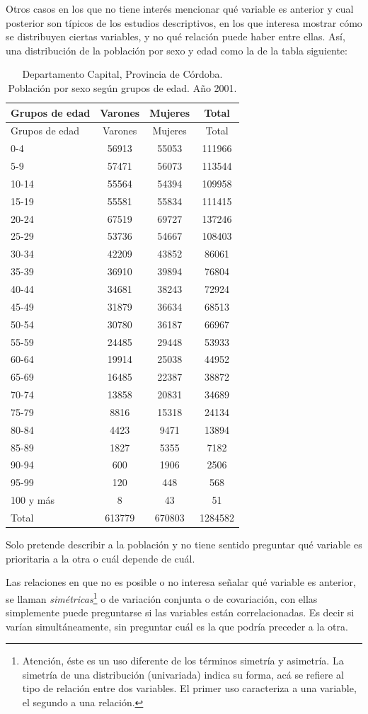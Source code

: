 \documentclass[]{book}
\let\rmarkdownfootnote\footnote%
\def\footnote{\protect\rmarkdownfootnote}
\begin{document}
Otros casos en los que no tiene interés mencionar qué variable es
anterior y cual posterior son típicos de los estudios descriptivos, en
los que interesa mostrar cómo se distribuyen ciertas variables, y no qué
relación puede haber entre ellas. Así, una distribución de la población por sexo y edad como la de la tabla siguiente:

\begin{longtable}[]{@{}lccc@{}}
\caption{\label{tab:unnamed-chunk-125}Departamento Capital, Provincia de Córdoba. Población por sexo según grupos de edad. Año 2001.}\tabularnewline
\toprule
Grupos de edad & Varones & Mujeres & Total\tabularnewline
\midrule
\endfirsthead
\toprule
Grupos de edad & Varones & Mujeres & Total\tabularnewline
\midrule
\endhead
0-4 & 56913 & 55053 & 111966\tabularnewline
5-9 & 57471 & 56073 & 113544\tabularnewline
10-14 & 55564 & 54394 & 109958\tabularnewline
15-19 & 55581 & 55834 & 111415\tabularnewline
20-24 & 67519 & 69727 & 137246\tabularnewline
25-29 & 53736 & 54667 & 108403\tabularnewline
30-34 & 42209 & 43852 & 86061\tabularnewline
35-39 & 36910 & 39894 & 76804\tabularnewline
40-44 & 34681 & 38243 & 72924\tabularnewline
45-49 & 31879 & 36634 & 68513\tabularnewline
50-54 & 30780 & 36187 & 66967\tabularnewline
55-59 & 24485 & 29448 & 53933\tabularnewline
60-64 & 19914 & 25038 & 44952\tabularnewline
65-69 & 16485 & 22387 & 38872\tabularnewline
70-74 & 13858 & 20831 & 34689\tabularnewline
75-79 & 8816 & 15318 & 24134\tabularnewline
80-84 & 4423 & 9471 & 13894\tabularnewline
85-89 & 1827 & 5355 & 7182\tabularnewline
90-94 & 600 & 1906 & 2506\tabularnewline
95-99 & 120 & 448 & 568\tabularnewline
100 y más & 8 & 43 & 51\tabularnewline
Total & 613779 & 670803 & 1284582\tabularnewline
\bottomrule
\end{longtable}

Solo pretende describir a la población y no tiene sentido preguntar qué variable es prioritaria a la otra o cuál depende de cuál.

Las relaciones en que no es posible o no interesa señalar qué variable
es anterior, se llaman \emph{simétricas}\footnote{Atención, éste es un uso diferente de los términos simetría y asimetría. La simetría de una distribución (univariada) indica su forma, acá se refiere al tipo de relación entre dos variables. El primer uso caracteriza a una variable, el segundo a una relación.} o de variación conjunta o de
covariación, con ellas simplemente puede preguntarse si las variables
están correlacionadas. Es decir si varían simultáneamente, sin
preguntar cuál es la que podría preceder a la otra.
\end{document}
